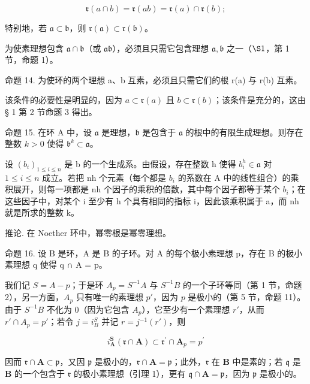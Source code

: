 \[
\mathfrak {r} (a \cap b) = \mathfrak {r} (a b) = \mathfrak {r} (a) \cap \mathfrak {r} (b);
\]

特别地，若 \(\mathfrak{a} \subset \mathfrak{b}\)，则 \(\mathfrak{r}(\mathfrak{a}) \subset \mathfrak{r}(\mathfrak{b})\)。

为使素理想包含 \(\mathfrak{a} \cap \mathfrak{b}\)（或 \(\mathfrak{ab}\)），必须且只需它包含理想 \(\mathfrak{a}, \mathfrak{b}\) 之一（\(\S 1\)，第 1 节，命题 1）。

命题 14. 为使环的两个理想 a、b 互素，必须且只需它们的根 r(a) 与 r(b) 互素。

该条件的必要性是明显的，因为 \(a \subset \mathfrak{r}(a)\) 且 \(b \subset \mathfrak{r}(b)\)；该条件是充分的，这由 § 1 第 2 节命题 3 得出。

命题 15. 在环 A 中，设 \(\mathfrak{a}\) 是理想，\(\mathfrak{b}\) 是包含于 \(\mathfrak{a}\) 的根中的有限生成理想。则存在整数 \(k > 0\) 使得 \(\mathfrak{b}^k \subset \mathfrak{a}\)。

设 \((b_{i})_{1\leqslant i\leqslant n}\) 是 b 的一个生成系。由假设，存在整数 h 使得 \(b_{i}^{h}\in\mathfrak{a}\) 对 \(1\leqslant i\leqslant n\) 成立。若把 nh 个元素（每个都是 \(b_{i}\) 的系数在 A 中的线性组合）的乘积展开，则每一项都是 nh 个因子的乘积的倍数，其中每个因子都等于某个 \(b_{i}\)；在这些因子中，对某个 i 至少有 h 个具有相同的指标 i，因此该乘积属于 a，而 nh 就是所求的整数 k。

推论. 在 Noether 环中，幂零根是幂零理想。

命题 16. 设 B 是环，A 是 B 的子环。对 A 的每个极小素理想 p，存在 B 的极小素理想 q 使得 q ∩ A = p。

我们记 \(S = A - p\)；于是环 \(A_p = S^{-1}A\) 与 \(S^{-1}B\) 的一个子环等同（第 1 节，命题 2），另一方面，\(A_p\) 只有唯一的素理想 \(p'\)，因为 \(p\) 是极小的（第 5 节，命题 11）。由于 \(S^{-1}B\) 不化为 0（因为它包含 \(A_p\)），它至少有一个素理想 \(r'\)，从而 \(r' \cap A_p = p'\)；若令 \(j = i_B^S\) 并记 \(r = j^{-1}(r')\)，则

\[
i _ {\mathbf {A}} ^ {\mathbf {S}} (\mathfrak {r} \cap \mathbf {A}) \subset \mathfrak {r} ^ {\prime} \cap \mathbf {A} _ {p} = p ^ {\prime}
\]

因而 \(\mathfrak{r} \cap \mathbf{A} \subset \mathfrak{p}\)，又因 \(\mathfrak{p}\) 是极小的，\(\mathfrak{r} \cap \mathbf{A} = \mathfrak{p}\)；此外，\(\mathfrak{r}\) 在 \(\mathbf{B}\) 中是素的；若 \(\mathfrak{q}\) 是 \(\mathbf{B}\) 的一个包含于 \(\mathfrak{r}\) 的极小素理想（引理 1），更有 \(\mathfrak{q} \cap \mathbf{A} = \mathfrak{p}\)，因为 \(\mathfrak{p}\) 是极小的。

